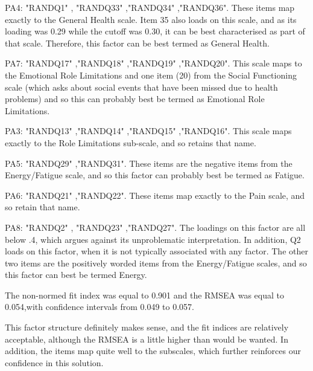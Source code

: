 \documentclass{article}
\begin{document}
PA4: "RANDQ1" , "RANDQ33" ,"RANDQ34" ,"RANDQ36". These items map exactly to the General Health scale. Item 35 also loads on this scale, and as its loading was 0.29 while the cutoff was 0.30, it can be best characterised as part of that scale. Therefore, this factor can be best termed as General Health.

PA7: "RANDQ17" ,"RANDQ18" ,"RANDQ19" ,"RANDQ20". This scale maps to the Emotional Role Limitations and one item (20) from the Social Functioning scale (which asks about social events that have been missed due to health problems) and so this can probably best be termed as Emotional Role Limitations.

PA3: "RANDQ13" ,"RANDQ14" ,"RANDQ15" ,"RANDQ16". This scale maps exactly to the Role Limitations sub-scale, and so retains that name. 

PA5: "RANDQ29" ,"RANDQ31". These items are the negative items from the Energy/Fatigue scale, and so this factor can probably best be termed as Fatigue. 

PA6: "RANDQ21" ,"RANDQ22". These items map exactly to the Pain scale, and so retain that name. 

PA8: "RANDQ2" , "RANDQ23" ,"RANDQ27". The loadings on this factor are all below .4, which argues against its unproblematic interpretation. In addition, Q2 loads on this factor, when it is not typically associated with any factor. The other two items are the positively worded items from the  Energy/Fatigue scales, and so this factor can best be termed Energy. 



The non-normed fit index was equal to 0.901
and the RMSEA was equal to 0.054,with confidence intervals from 0.049 to 0.057.

This factor structure definitely makes sense, and the fit indices are relatively acceptable, although the RMSEA is a little higher than would be wanted. In addition, the items map quite well to the subscales, which further reinforces our confidence in this solution.
\end{document}
